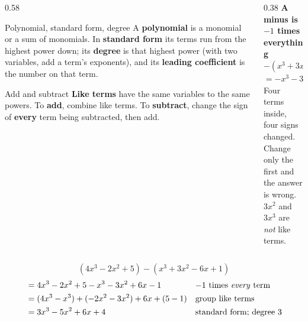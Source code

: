 \documentclass[aspectratio=169, 11pt]{beamer}
\begin{document}
\begin{frame}[t, plain]
  \begin{columns}[T]
    \begin{column}{0.58\textwidth}
      \begin{block}{Polynomial, standard form, degree}
        \small A \textbf{polynomial} is a monomial or a sum of monomials. In \textbf{standard
        form} its terms run from the highest power down; its \textbf{degree} is that highest
        power (with two variables, add a term's exponents), and its \textbf{leading
        coefficient} is the number on that term.
      \end{block}
      \vspace{2pt}
      \begin{block}{Add and subtract}
        \small \textbf{Like terms} have the same variables to the same powers. To
        \textbf{add}, combine like terms. To \textbf{subtract}, change the sign of
        \textbf{every} term being subtracted, then add.
      \end{block}
    \end{column}
    \begin{column}{0.38\textwidth}
      \centering
      \textbf{A minus is $-1$ times everything}\\[8pt]
      $-(x^3+3x^2-6x+1)$\\[4pt]
      $=-x^3-3x^2+6x-1$\\[10pt]
      {\scriptsize Four terms inside, four signs changed. \\ Change only the first and the answer
      is wrong.}\\[8pt]
      {\scriptsize $3x^2$ and $3x^3$ are \emph{not} like terms.}
    \end{column}
  \end{columns}
\end{frame}

\begin{frame}[t, plain]
  \[ (4x^3-2x^2+5)-(x^3+3x^2-6x+1) \]
  \[
  \begin{aligned}
    &= 4x^3-2x^2+5-x^3-3x^2+6x-1 && \text{$-1$ times \emph{every} term}\\
    &= (4x^3-x^3)+(-2x^2-3x^2)+6x+(5-1) && \text{group like terms}\\
    &= 3x^3-5x^2+6x+4 && \text{standard form; degree } 3
  \end{aligned}
  \]
\end{frame}
\end{document}

